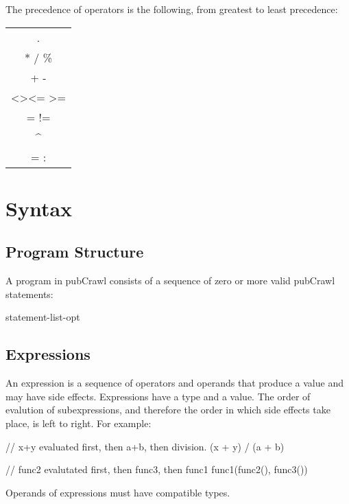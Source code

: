 \documentclass[oneside]{book}
\begin{document}
The precedence of operators is the following, from greatest to least precedence:

\begin{center}
  \begin{tabular}{c}
  .\\
  * / \% \\
  + -\\
  \textless \textgreater \textless= \textgreater=\\
  = != \\
  \textasciicircum\\ 
  = :  \\
  \end{tabular}
\end{center}




\chapter{Syntax}
\section{Program Structure}

A program in pubCrawl consists of a sequence of zero or more valid pubCrawl statements:
\begin{code}
statement-list-opt
\end{code}

\section{Expressions}
An expression is a sequence of operators and operands that produce a value and may have side effects. Expressions have a type and a value. The order of evalution of subexpressions, and therefore the order in which side effects take place, is left to right. For example:

\begin{mdframed}
[hidealllines=true,backgroundcolor=gray!10,skipbelow=.5em,skipabove=.5em]
\begin{code}

// x+y evaluated first, then a+b, then division.
(x + y) / (a + b)

// func2 evalutated first, then func3, then func1
func1(func2(), func3())

\end{code}
\end{mdframed}
Operands of expressions must have compatible types.
\end{document}
